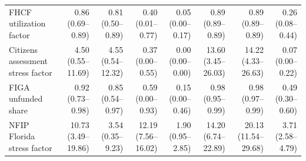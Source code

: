 \begin{tabular}{lrrrrrrr}
\midrule
FHCF utilization factor & 0.86 (0.69--0.89) & 0.81 (0.50--0.89) & 0.40 (0.01--0.77) & 0.05 (0.00--0.17) & 0.89 (0.89--0.89) & 0.89 (0.89--0.89) & 0.26 (0.08--0.44) \\
Citizens assessment stress factor & 4.50 (0.55--11.69) & 4.55 (0.54--12.32) & 0.37 (0.00--0.55) & 0.00 (0.00--0.00) & 13.60 (3.45--26.03) & 14.22 (4.33--26.63) & 0.07 (0.00--0.22) \\
FIGA unfunded share & 0.92 (0.73--0.98) & 0.85 (0.54--0.97) & 0.59 (0.00--0.93) & 0.15 (0.00--0.46) & 0.98 (0.95--0.99) & 0.98 (0.97--0.99) & 0.49 (0.30--0.60) \\
NFIP Florida stress factor & 10.73 (3.49--19.86) & 3.54 (0.35--9.23) & 12.19 (7.56--16.02) & 1.90 (0.95--2.85) & 14.20 (6.74--22.89) & 20.13 (11.54--29.68) & 3.71 (2.58--4.79) \\
\bottomrule
\end{tabular}
